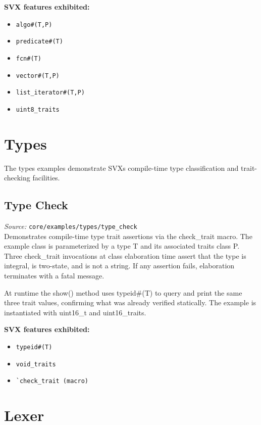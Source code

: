 \documentclass[11pt,letterpaper]{report}
\begin{document}
\textbf{SVX features exhibited:}

\begin{itemize}
  \item \texttt{algo\#(T,P)}
  \item \texttt{predicate\#(T)}
  \item \texttt{fcn\#(T)}
  \item \texttt{vector\#(T,P)}
  \item \texttt{list\_iterator\#(T,P)}
  \item \texttt{uint8\_traits}
\end{itemize}
\chapter{Types}

The types examples demonstrate SVX\textquotesingle s compile-time type classification and trait-checking facilities.

\section{Type Check}

\textit{Source:} \texttt{core/examples/types/type\_check}\\

Demonstrates compile-time type trait assertions via the check\_trait macro. The example class is parameterized by a type T and its associated traits class P. Three check\_trait invocations at class elaboration time assert that the type is integral, is two-state, and is not a string. If any assertion fails, elaboration terminates with a fatal message.

At runtime the show() method uses typeid\#(T) to query and print the same three trait values, confirming what was already verified statically. The example is instantiated with uint16\_t and uint16\_traits.

\textbf{SVX features exhibited:}

\begin{itemize}
  \item \texttt{typeid\#(T)}
  \item \texttt{void\_traits}
  \item \texttt{\texttt{\`{}check\_trait}\ (macro)}
\end{itemize}
\chapter{Lexer}
\end{document}
